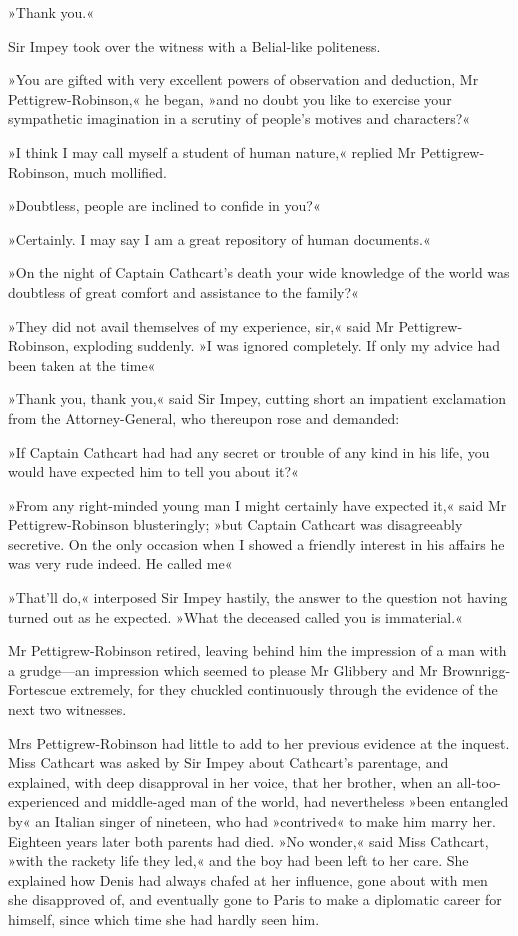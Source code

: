 »Thank you.«

Sir Impey took over the witness with a Belial-like politeness.

»You are gifted with very excellent powers of observation and deduction, Mr Pettigrew-Robinson,« he began, »and no doubt you like to exercise your sympathetic imagination in a scrutiny of people's motives and characters?«

»I think I may call myself a student of human nature,« replied Mr  Pettigrew-Robinson, much mollified.

»Doubtless, people are inclined to confide in you?«

»Certainly. I may say I am a great repository of human documents.«

»On the night of Captain Cathcart's death your wide knowledge of the world was doubtless of great comfort and assistance to the family?«

»They did not avail themselves of my experience, sir,« said Mr  Pettigrew-Robinson, exploding suddenly. »I was ignored completely. If only my advice had been taken at the time\longdash«

»Thank you, thank you,« said Sir Impey, cutting short an impatient exclamation from the Attorney-General, who thereupon rose and demanded:

»If Captain Cathcart had had any secret or trouble of any kind in his life, you would have expected him to tell you about it?«

»From any right-minded young man I might certainly have expected it,« said Mr Pettigrew-Robinson blusteringly; »but Captain Cathcart was disagreeably secretive. On the only occasion when I showed a friendly interest in his affairs he was very rude indeed. He called me\longdash«

»That'll do,« interposed Sir Impey hastily, the answer to the question not having turned out as he expected. »What the deceased called you is immaterial.«

Mr Pettigrew-Robinson retired, leaving behind him the impression of a man with a grudge—an impression which seemed to please Mr Glibbery and Mr Brownrigg-Fortescue extremely, for they chuckled continuously through the evidence of the next two witnesses.

Mrs Pettigrew-Robinson had little to add to her previous evidence at the inquest. Miss Cathcart was asked by Sir Impey about Cathcart's parentage, and explained, with deep disapproval in her voice, that her brother, when an all-too-experienced and middle-aged man of the world, had nevertheless »been entangled by« an Italian singer of nineteen, who had »contrived« to make him marry her. Eighteen years later both parents had died. »No wonder,« said Miss Cathcart, »with the rackety life they led,« and the boy had been left to her care. She explained how Denis had always chafed at her influence, gone about with men she disapproved of, and eventually gone to Paris to make a diplomatic career for himself, since which time she had hardly seen him.

